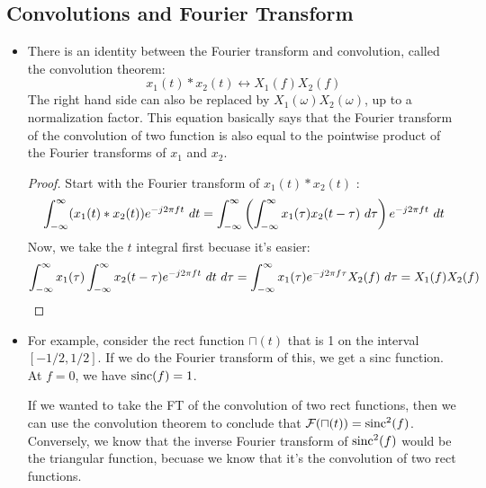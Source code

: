 \subsection{Convolutions and Fourier Transform} 
\begin{itemize}
	\item There is an identity between the Fourier transform and convolution, called the convolution theorem: 
		\[
		x_1(t) * x_2(t) \leftrightarrow X_1(f) X_2(f)
		\] 
		The right hand side can also be replaced by \( X_1(\omega) X_2(\omega) \), up to a normalization factor. 
		This equation basically says that the Fourier transform of the convolution of two function is also equal to the
		pointwise product of the Fourier transforms of \( x_1 \) and \( x_2 \). 

		\begin{proof}
			Start with the Fourier transform of \( x_1(t) * x_2(t) \) :
			\[
			\int_{-\infty}^{\infty} (x_1(t) * x_2(t)) e^{-j 2 \pi ft}\ d t = \int_{-\infty}^{\infty} \left( 
			\int_{-\infty}^{\infty} x_1(\tau) x_2(t - \tau) \ d \tau \right) e^{-j 2 \pi ft}\ d t 
			\] 
			Now, we take the \( t \) integral first becuase it's easier: 
			\[
			\int_{-\infty}^{\infty} x_1(\tau) \int_{-\infty}^{\infty} x_2(t - \tau) e^{-j 2 \pi ft}\ d t  \ d \tau
			= \int_{-\infty}^{\infty} x_1(\tau) e^{-j 2 \pi f\tau}X_2(f) \ d \tau = X_1(f) X_2(f) 
			\] 
		\end{proof}
	\item For example, consider the rect function \( \sqcap(t) \) that is 1 on the interval \( [-1 / 2, 1/2] \). 
		If we do the Fourier transform of this, we get a sinc function. At \( f = 0 \), we have 
		\( \mathrm{sinc}(f) = 1 \). 

		If we wanted to take the FT of the convolution of two rect functions, then we can use the convolution theorem 
		to conclude that \( \mathcal F(\sqcap(t)) = \mathrm{sinc}^2(f) \). Conversely, we know that the inverse Fourier 
		transform of \( \mathrm{sinc}^2(f) \) would be the triangular function, becuase we know that it's the convolution 
		of two rect functions.
\end{itemize}
